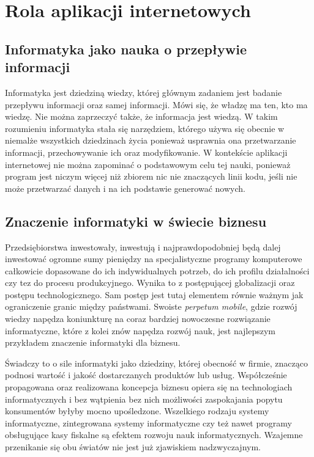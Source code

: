 \chapter{Rola aplikacji internetowych}
\label{chaper:web_app_purpose}

\section{Informatyka jako nauka o przepływie informacji}
	Informatyka jest dziedziną wiedzy, której głównym zadaniem jest badanie przepływu informacji oraz samej informacji. 
	Mówi się, że władzę ma ten, kto ma wiedzę. Nie można zaprzeczyć także, że informacja jest wiedzą. W takim rozumieniu
	informatyka stała się narzędziem, którego używa się obecnie w niemalże wszystkich dziedzinach życia ponieważ usprawnia
	ona przetwarzanie informacji, przechowywanie ich oraz modyfikowanie. 
	W kontekście aplikacji internetowej nie można zapominać o podstawowym celu tej nauki, ponieważ program jest niczym 
	więcej niż zbiorem nic nie znaczących linii kodu, jeśli nie może przetwarzać danych i na ich podstawie generować nowych.
	
\section{Znaczenie informatyki w świecie biznesu}
	Przedsiębiorstwa inwestowały, inwestują i najprawdopodobniej będą dalej inwestować ogromne sumy pieniędzy na specjalistyczne programy 
	komputerowe całkowicie dopasowane do ich indywidualnych potrzeb, do ich profilu działalności czy tez do procesu produkcyjnego.
	Wynika to z postępującej globalizacji oraz postępu technologicznego. Sam postęp jest tutaj elementem równie ważnym jak ograniczenie 
	granic między państwami. Swoiste \textit{perpetum mobile}, gdzie rozwój wiedzy napędza koniunkturę na coraz bardziej nowoczesne 
	rozwiązanie informatyczne, które z kolei znów napędza rozwój nauk, jest najlepszym przykładem znaczenie informatyki dla biznesu. 
		
	Świadczy to	o sile informatyki jako dziedziny, której obecność w firmie, znacząco podnosi wartość i jakość dostarczanych produktów lub usług. 
	Współcześnie propagowana oraz realizowana koncepcja biznesu opiera się na technologiach informatycznych i bez wątpienia bez nich możliwości
	zaspokajania popytu konsumentów byłyby mocno upośledzone. Wszelkiego rodzaju systemy informatyczne, zintegrowana systemy informatyczne czy
	też nawet programy obsługujące kasy fiskalne są efektem rozwoju nauk informatycznych. Wzajemne przenikanie się obu światów nie jest 
	już zjawiskiem nadzwyczajnym.
	
